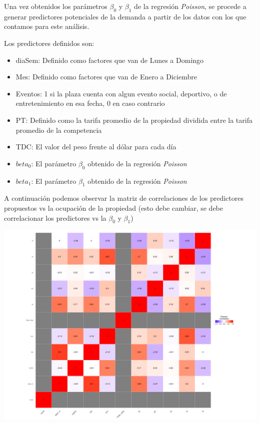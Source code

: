 Una vez obtenidos los parámetros $\beta_0$ y $\beta_1$ de la regresión \emph{Poisson}, se procede a generar predictores potenciales de la demanda a partir de los datos con los que contamos para este análisis.

Los predictores definidos son:

\begin{itemize}
  \item diaSem: Definido como factores que van de Lunes a Domingo
  \item Mes: Definido como factores que van de Enero a Diciembre
  \item Eventos: 1 si la plaza cuenta con algun evento social, deportivo, o de entretenimiento en esa fecha, 0 en caso contrario
  \item PT: Definido como la tarifa promedio de la propiedad dividida entre la tarifa promedio de la competencia
  \item TDC: El valor del peso frente al dólar para cada día
  \item $beta_0$: El parámetro $\beta_0$ obtenido de la regresión \emph{Poisson}
  \item $beta_1$: El parámetro $\beta_1$ obtenido de la regresión \emph{Poisson}
\end{itemize}

A continuación podemos observar la matriz de correlaciones de los predictores propuestos vs la ocupación de la propiedad (esto debe cambiar, se debe correlacionar los predictores vs la $\beta_0$ y $\beta_1$)

\color{fgcolor}
\includegraphics[width=\maxwidth]{figures/Correlacion-1} 


